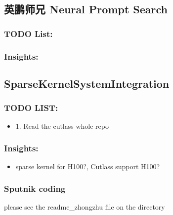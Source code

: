 \documentclass[UTF8]{article}
\begin{document}
\subsection{英鹏师兄 Neural Prompt Search}
    \subsubsection{TODO List:}
    \subsubsection{Insights:}
    
\subsection{SparseKernelSystemIntegration}
    \subsubsection{TODO LIST:}
    \begin{itemize}
        \item 1. Read the cutlass whole repo
    \end{itemize}
    \subsubsection{Insights:}
    \begin{itemize}
        \item sparse kernel for H100?, Cutlass support H100?
    \end{itemize}
    \subsubsection{Sputnik coding}
    please see the readme\_zhongzhu file on the directory
\end{document}
